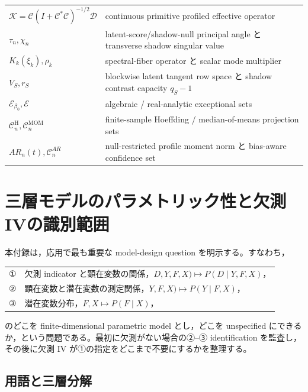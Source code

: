 \documentclass[11pt,a4paper]{ltjsarticle}
\theoremstyle{remark}
\newcommand{\cC}{\mathcal C}
\newcommand{\Cop}{\mathscr C}
\newcommand{\Jcal}{\mathscr D}
\newcommand{\Kop}{\mathscr K}
\begin{document}
\begin{longtable}{p{34mm}p{112mm}}
$\Kop=\Cop(I+\Cop^*\Cop)^{-1/2}\Jcal$ & continuous primitive profiled effective operator\\
$\tau_n,\chi_n$ & latent-score/shadow-null principal angle と transverse shadow singular value\\
$K_k(\xi_k),\rho_k$ & spectral-fiber operator と scalar mode multiplier\\
$V_S,r_S$ & blockwise latent tangent row space と shadow contrast capacity $q_S-1$\\
$\mathcal E_{\beta_0},\mathcal E$ & algebraic / real-analytic exceptional sets\\
$\cC_n^{\mathrm H},\cC_n^{\mathrm{MOM}}$ & finite-sample Hoeffding / median-of-means projection sets\\
$AR_n(t),\cC_n^{AR}$ & null-restricted profile moment norm と bias-aware confidence set\\
\bottomrule
\end{longtable}


\section{三層モデルのパラメトリック性と欠測IVの識別範囲}
\label{app:three-layer-taxonomy}

本付録は，応用で最も重要な model-design question を明示する。すなわち，
\begin{center}
\begin{tabular}{ll}
① & 欠測 indicator と顕在変数の関係，\(D,Y,F,X)\mapsto P(D\mid Y,F,X)\)，\\
② & 顕在変数と潜在変数の測定関係，\(Y,F,X)\mapsto P(Y\mid F,X)\)，\\
③ & 潜在変数分布，\(F,X\mapsto P(F\mid X)\)，
\end{tabular}
\end{center}
のどこを finite-dimensional parametric model とし，どこを unspecified にできるか，という問題である。最初に欠測がない場合の②--③ identification を監査し，その後に欠測 IV が①の指定をどこまで不要にするかを整理する。

\subsection{用語と三層分解}
\end{document}
